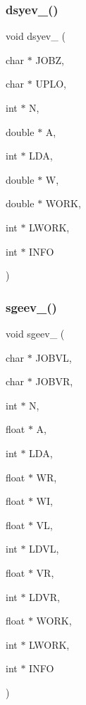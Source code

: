\mbox{\label{a00476_a34948ab00349d4a3a6e4498bb7bb1540}} 
\subsubsection{\texorpdfstring{dsyev\+\_\+()}{dsyev\_()}}
{\footnotesize\ttfamily void dsyev\+\_\+ (\begin{DoxyParamCaption}\item[{char $\ast$}]{J\+O\+BZ,  }\item[{char $\ast$}]{U\+P\+LO,  }\item[{int $\ast$}]{N,  }\item[{double $\ast$}]{A,  }\item[{int $\ast$}]{L\+DA,  }\item[{double $\ast$}]{W,  }\item[{double $\ast$}]{W\+O\+RK,  }\item[{int $\ast$}]{L\+W\+O\+RK,  }\item[{int $\ast$}]{I\+N\+FO }\end{DoxyParamCaption})}

\mbox{\label{a00476_aad9901e2647c52ccb37aa880bb3be274}} 
\subsubsection{\texorpdfstring{sgeev\+\_\+()}{sgeev\_()}}
{\footnotesize\ttfamily void sgeev\+\_\+ (\begin{DoxyParamCaption}\item[{char $\ast$}]{J\+O\+B\+VL,  }\item[{char $\ast$}]{J\+O\+B\+VR,  }\item[{int $\ast$}]{N,  }\item[{float $\ast$}]{A,  }\item[{int $\ast$}]{L\+DA,  }\item[{float $\ast$}]{WR,  }\item[{float $\ast$}]{WI,  }\item[{float $\ast$}]{VL,  }\item[{int $\ast$}]{L\+D\+VL,  }\item[{float $\ast$}]{VR,  }\item[{int $\ast$}]{L\+D\+VR,  }\item[{float $\ast$}]{W\+O\+RK,  }\item[{int $\ast$}]{L\+W\+O\+RK,  }\item[{int $\ast$}]{I\+N\+FO }\end{DoxyParamCaption})}

